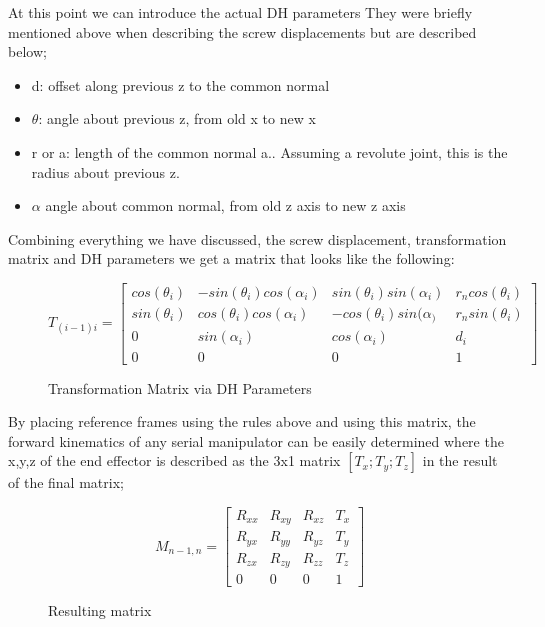             At this point we can introduce the actual DH parameters They were briefly mentioned above when describing the screw displacements but are described below;
            \begin{itemize}
                \item d: offset along previous  z to the common normal
                \item $\theta$: angle about previous z, from old x to new x
                \item r or a: length of the common normal a.. Assuming a revolute joint, this is the radius about previous z.
                \item $\alpha$ angle about common normal, from old z axis to new z axis
            \end{itemize}
            Combining everything we have discussed, the screw displacement, transformation matrix and DH parameters we get a matrix that looks like the following:
            \begin{figure}
                \centering
                $$ T_{(i-1)i} = \begin{bmatrix}
                    cos(\theta_i) & -sin(\theta_i) cos(\alpha_i) & sin(\theta_i) sin(\alpha_i) & r_n cos(\theta_i) \\
                    sin(\theta_i) & cos(\theta_i) cos(\alpha_i) & -cos(\theta_i) sin(\alpha_) & r_n sin(\theta_i) \\
                    0 & sin(\alpha_i) & cos(\alpha_i) & d_i  \\
                    0 & 0 & 0 & 1
                \end{bmatrix} $$
                \caption{Transformation Matrix via DH Parameters}
                \label{fig:TransformationMatrix}
            \end{figure}
            By placing reference frames using the rules above and using this matrix, the forward kinematics of any serial manipulator can be easily determined where the x,y,z of the end effector is described as the 3x1 matrix $[T_x; T_y; T_z]$ in the result of the final matrix; 
            
            \begin{figure}[H]
                \centering
                $$ M_{n-1, n} = \begin{bmatrix}
                    R_{xx} & R_{xy} & R_{xz} & T_x \\
                    R_{yx} & R_{yy} & R_{yz} & T_y \\
                    R_{zx} & R_{zy} & R_{zz} & T_z \\
                    0 & 0 & 0 & 1
                \end{bmatrix}$$
                \caption{Resulting matrix}
                \label{fig:ResultingMatrix}
            \end{figure}
